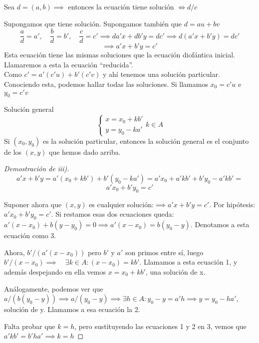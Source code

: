 \begin{nlist}
	\item Sea $d=(a,b)\implies$ entonces la ecuación tiene solución $\iff d/c$
	\item Supongamos que tiene solución. Supongamos también que $d= au+bv$
\[
\frac{a}{d}= a',\quad \frac{b}{d}=b',\quad \frac{c}{d}=c'\implies da'x + db'y = dc' \implies d(a'x+b'y)=dc'\]
\[ \implies a'x+b'y = c'
\]
Esta ecuación tiene las mismas soluciones que la ecuación diofántica inicial. Llamaremos a esta la ecuación ``reducida''.\\


Como $c'= a'(c'u)+b'(c'v)$ y ahí tenemos una solución particular. Conociendo esta, podemos hallar todas las soluciones. Si llamamos $x_0 =c'u$ e $y_0 = c'v$

\item Solución general \[\begin{cases}
	x = x_0 +kb'\\
	y= y_0 -ka'
\end{cases} k\in A\]
Si $(x_0,y_0)$ es la solución particular, entonces la solución general es el conjunto de los $(x,y)$ que hemos dado arriba.
\\
\begin{proof}[Demostración de iii)]

\[
a'x + b'y = a'(x_0 +kb') + b'(y_0 - ka') = a'x_0 + a'kb' + b'y_0 - a'kb' =
\]
\[
a'x_0 +b'y_0 = c'
\]

Suponer ahora que $(x,y)$ es cualquier solución:$\implies a'x +b'y = c'$. Por hipótesis: $a'x_0 +b'y_0 = c'$. Si restamos esas dos ecuaciones queda: $a'(x-x_0) +b(y-y_0) = 0 \implies a'(x-x_0) = b(y_0-y)$. Denotamos a esta ecuación como 3.

Ahora, $b'/(a'(x-x_0))$ pero $b'$ y $a'$ son primos entre sí, luego $b'/(x-x_0)\implies \quad \exists k \in A : (x-x_0) = kb'$. Llamamos a esta ecuación 1, y además despejando en ella vemos $x = x_0 + kb'$, una solución de x.

Análogamente, podemos ver que $a/(b(y_0-y)) \implies a/(y_0-y) \implies \exists h \in A: y_0 -y = a'h \implies y = y_0 - ha'$, solución de y. Llamamos a esa ecuación la 2.

Falta probar que $k = h$, pero sustituyendo las ecuaciones 1 y 2 en 3, vemos que $a'kb'  = b'ha' \implies k = h$

\end{proof}

\end{nlist}

